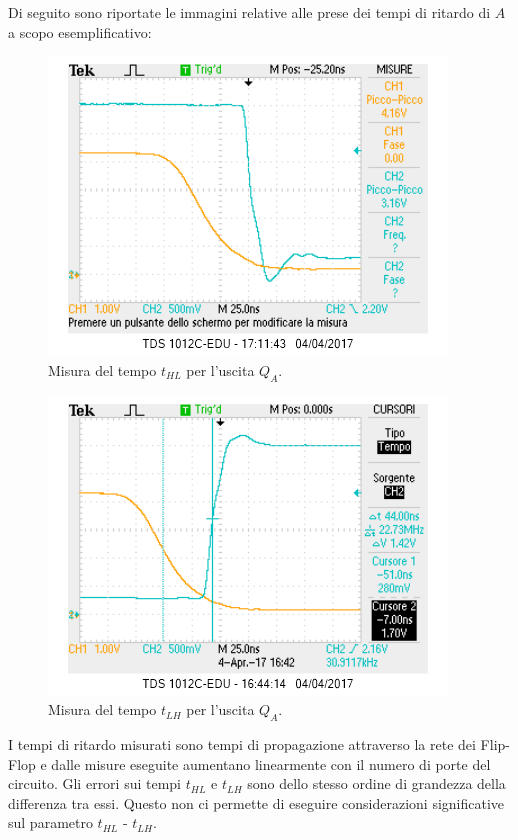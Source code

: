 \documentclass[10pt,a4paper]{article}
\begin{document}
Di seguito sono riportate le immagini relative alle prese dei tempi di ritardo di $A$ a scopo esemplificativo:

\begin{figure}
\centering
\includegraphics[scale=1.0]{tphlQA.png}
\caption{Misura del tempo $t_{HL}$ per l'uscita $Q_A$.\label{qa1}}
\end{figure}

\begin{figure}
\centering
\includegraphics[scale=1.0]{tplhQA.png}
\caption{Misura del tempo $t_{LH}$ per l'uscita $Q_A$.\label{qa2}}
\end{figure}


I tempi di ritardo misurati sono tempi di propagazione attraverso la rete dei Flip-Flop e dalle misure eseguite aumentano linearmente con il numero di porte del circuito. Gli errori sui tempi $t_{HL}$ e $t_{LH}$ sono dello stesso ordine di grandezza della differenza tra essi. Questo non ci permette di eseguire considerazioni significative sul parametro $t_{HL}$ - $t_{LH}$.\\
\end{document}
